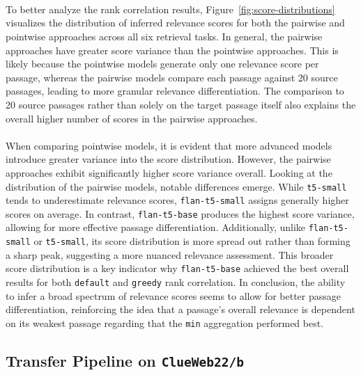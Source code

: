 \\\\\\
To better analyze the rank correlation results, Figure~\ref{fig:score-distributions} visualizes the distribution of inferred relevance scores for both the pairwise and pointwise approaches across all six retrieval tasks. In general, the pairwise approaches have greater score variance than the pointwise approaches. This is likely because the pointwise models generate only one relevance score per passage, whereas the pairwise models compare each passage against 20 source passages, leading to more granular relevance differentiation. The comparison to 20 source passages rather than solely on the target passage itself also explains the overall higher number of scores in the pairwise approaches.
\\\\
When comparing pointwise models, it is evident that more advanced models introduce greater variance into the score distribution. However, the pairwise approaches exhibit significantly higher score variance overall. Looking at the distribution of the pairwise models, notable differences emerge. While \texttt{t5-small} tends to underestimate relevance scores, \texttt{flan-t5-small} assigns generally higher scores on average. In contrast, \texttt{flan-t5-base} produces the highest score variance, allowing for more effective passage differentiation. Additionally, unlike \texttt{flan-t5-small} or \texttt{t5-small}, its score distribution is more spread out rather than forming a sharp peak, suggesting a more nuanced relevance assessment. This broader score distribution is a key indicator why \texttt{flan-t5-base} achieved the best overall results for both \texttt{default} and \texttt{greedy} rank correlation. In conclusion, the ability to infer a broad spectrum of relevance scores seems to allow for better passage differentiation, reinforcing the idea that a passage's overall relevance is dependent on its weakest passage regarding that the \texttt{min} aggregation performed best.

\pagebreak
\subsection{Transfer Pipeline on \texttt{ClueWeb22/b}}\label{eval-pairwise-preferences-target}

